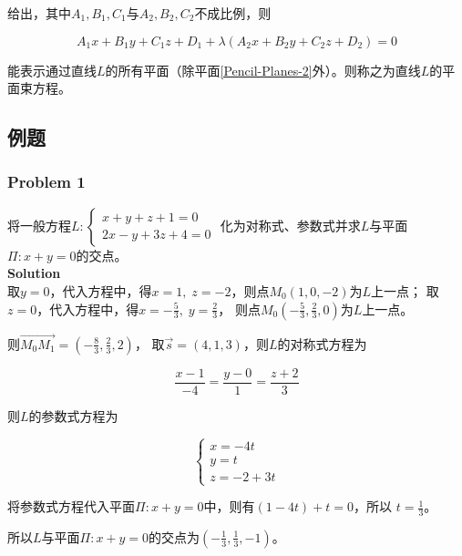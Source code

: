 \documentclass[12pt, a4paper]{article}
\numberwithin{equation}{section}
\begin{document}
    给出，其中\(A_1, B_1, C_1\)与\(A_2, B_2, C_2\)不成比例，则

    \begin{equation}
        A_1 x+B_1 y+C_1 z+D_1+\lambda\left(A_2x+B_2y+C_2z+D_2\right) = 0
    \end{equation}

    能表示通过直线\(L\)的所有平面（除平面\ref{Pencil-Planes-2}外）。则称之为直线\(L\)的平面束方程。

\subsection{例题}

\subsubsection{Problem 1}

    将一般方程$L:\left\{\begin{array}{l}x+y+z+1=0 \\ 2 x-y+3z+4=0\end{array}\right.$
    化为对称式、参数式并求\(L\)与平面\(\mathit{\Pi}: x + y =0\)的交点。
    \\

    \textbf{Solution}
    \\

    取\(y = 0\)，代入方程中，得\(x=1,\; z=-2\)，则点\(M_{0}\left(1,0,-2\right)\)为\(L\)上一点；
    取\(z = 0\)，代入方程中，得\(x=-\frac{5}{3},\; y=\frac{2}{3}\)，
    则点\(M_{0}\left(-\frac{5}{3},\frac{2}{3},0\right)\)为\(L\)上一点。

    则\(\overrightarrow{M_{0}M_{1}} = \left(-\frac{8}{3},\frac{2}{3},2\right)\)，
    取\(\overrightarrow{s} = \left(4,1,3\right)\)，则\(L\)的对称式方程为

    \[
        \frac{x-1}{-4}=\frac{y-0}{1}=\frac{z+2}{3}
    \]

    则\(L\)的参数式方程为

    $$
        \left\{\begin{array}{l}
        x=-4 t \\
        y=t \\
        z=-2+3 t
        \end{array}\right.
    $$

    将参数式方程代入平面\(\mathit{\Pi}: x + y =0\)中，则有\(\left(1-4t\right) + t = 0\)，所以
    \(t = \frac{1}{3}\)。

    所以\(L\)与平面\(\mathit{\Pi}: x + y =0\)的交点为\(\left(-\frac{1}{3},\frac{1}{3},-1\right)\)。
\end{document}
